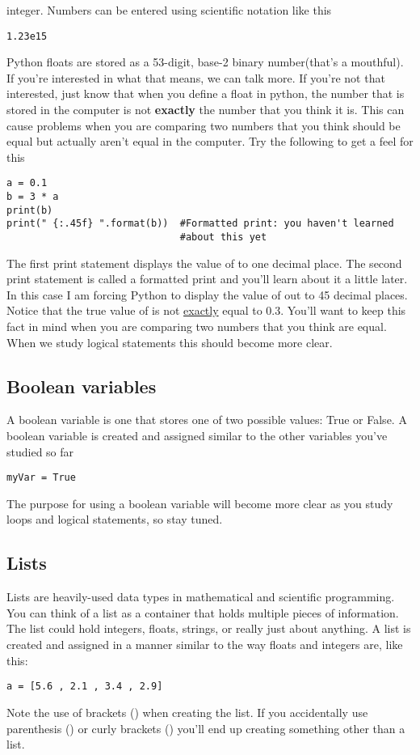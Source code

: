 integer.
Numbers can be entered using scientific notation like this
\begin{Verbatim}
1.23e15
\end{Verbatim}
Python floats are stored as a 53-digit, base-2 binary number(that's a
mouthful).  If you're interested in what that means, we can talk more.
If you're not that interested, just know that when you define a float
in python, the number that is stored in the computer is not
\textbf{exactly} the number that you think it is.  This can cause
problems when you are comparing two numbers that you think should be
equal but actually aren't equal in the computer.   Try the following to get a feel for this
\begin{Verbatim}
a = 0.1
b = 3 * a
print(b)
print(" {:.45f} ".format(b))  #Formatted print: you haven't learned
                              #about this yet
\end{Verbatim}
The first print statement displays the value of  to one
decimal place.  The second print statement is called a formatted print
and you'll learn about it a little later.  In this case I am forcing
Python to display the value of  out to 45 decimal places.
Notice that the true value of  is not \ul{exactly} equal to
0.3.  You'll want to keep this fact in mind when you are comparing two
numbers that you think are equal.  When we study logical statements
this should become more clear.

\subsection*{Boolean variables}
A boolean variable is one that stores one of two possible values: True
or False.  A boolean variable is created and assigned similar to the
other variables you've studied so far
\begin{Verbatim}
myVar = True
\end{Verbatim}
The purpose for using a boolean variable will become more clear as you
study loops and logical statements, so stay tuned.

\subsection*{Lists}
Lists are heavily-used data types in mathematical and
scientific programming.  You can think of a list as a
container that holds multiple pieces of information. The list could
hold integers, floats, strings, or really just about anything. A list
is created and assigned in a manner similar to the way floats and
integers are, like this:
\begin{Verbatim}
a = [5.6 , 2.1 , 3.4 , 2.9]
\end{Verbatim}
Note the use of brackets (\code{[]}) when creating the list. If you
accidentally use parenthesis (\code{()})
or curly brackets (\code{\{\}}) you'll end up creating something other
than a list.

